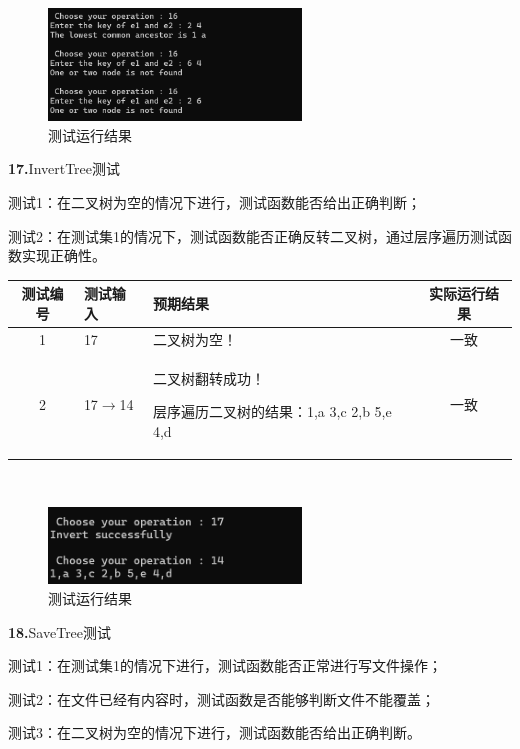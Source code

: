 \documentclass[supercite]{Experimental_Report}
\theoremstyle{definition}
\begin{document}
~\

\begin{figure}[H]
 	\centering
 	\includegraphics[width=0.6\textwidth]{images/二叉树测试16.png}
 	\caption{测试运行结果}
 	\label{txlab}
 \end{figure}

\noindent\textbf{17.}InvertTree测试

测试1：在二叉树为空的情况下进行，测试函数能否给出正确判断；

测试2：在测试集1的情况下，测试函数能否正确反转二叉树，通过层序遍历测试函数实现正确性。

\vspace{0.5em}

\begin{tabular}{|c|p{2.7cm}|p{6cm}|c|}
	\hline
	测试编号 & 测试输入 & 预期结果 & 实际运行结果 \\
	\hline
	1 & 17 & 二叉树为空！ & 一致 \\
	\hline
	2 & 17$\rightarrow$14 & 二叉树翻转成功！

层序遍历二叉树的结果：1,a 3,c 2,b 5,e 4,d & 一致 \\
	\hline
\end{tabular}

~\

\begin{figure}[H]
 	\centering
 	\includegraphics[width=0.6\textwidth]{images/二叉树测试17.png}
 	\caption{测试运行结果}
 	\label{txlab}
 \end{figure}

\noindent\textbf{18.}SaveTree测试

测试1：在测试集1的情况下进行，测试函数能否正常进行写文件操作；

测试2：在文件已经有内容时，测试函数是否能够判断文件不能覆盖；

测试3：在二叉树为空的情况下进行，测试函数能否给出正确判断。
\end{document}
